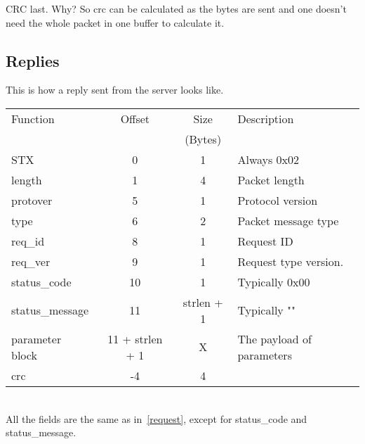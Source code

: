 \documentclass[a4paper]{article}
\begin{document}
CRC last. Why? So crc can be calculated as the bytes are sent
and one doesn't need the whole packet in one buffer to calculate it.



\subsection{Replies}

This is how a reply sent from the server looks like.

\begin{centering}
\begin{tabular}{|l|c|c|l|}\hline
Function        & Offset & Size        & Description           \\
                &        & (Bytes)     &                       \\\hline
STX             &  0     & 1           & Always 0x02           \\\hline
length          &  1     & 4           & Packet length         \\\hline
protover        &  5     & 1           & Protocol version      \\\hline
type            &  6     & 2           & Packet message type   \\\hline
req\_id         &  8     & 1           & Request ID            \\\hline
req\_ver        &  9     & 1           & Request type version. \\\hline
status\_code    & 10     & 1           & Typically 0x00        \\\hline
status\_message & 11     & strlen + 1  & Typically ""          \\\hline
parameter block & 11 + strlen + 1 
                         & X           & The payload of 
                                         parameters            \\\hline
crc             & -4     & 4           &                       \\\hline
\end{tabular}
\end{centering}
~\\

All the fields are the same as in~\ref{request}, except for status\_code and
status\_message.
\end{document}
